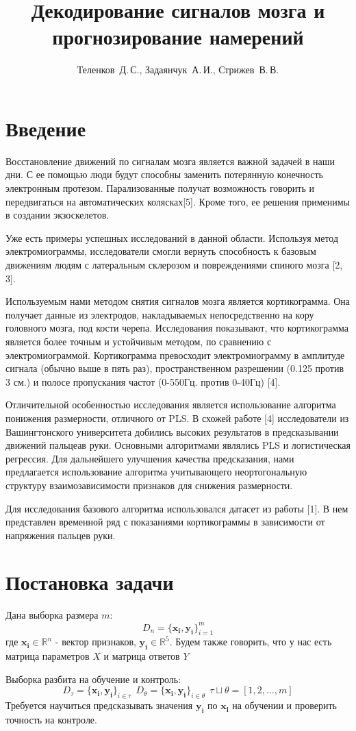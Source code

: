 \documentclass[12pt,twoside]{article}
\title
    [Декодирование сигналов мозга и прогнозирование намерений] %
    {Декодирование сигналов мозга и прогнозирование намерений} %
\author
    [Теленков~Д.\,С.] %
    {Теленков~Д.\,С., Задаянчук~А.\,И., Стрижев~В.\,В.} %
\begin{document}
\maketitle
\section{Введение}
Восстановление движений по сигналам мозга является важной задачей в наши дни. С ее помощью люди будут способны заменить потерянную конечность электронным протезом. Парализованные получат возможность говорить и передвигаться на автоматических колясках[5]. Кроме того, ее решения применимы в создании экзоскелетов.\par
Уже есть примеры успешных исследований в данной области. Используя метод электромиограммы, исследователи смогли вернуть способность к базовым движениям людям с латеральным склерозом и повреждениями спиного мозга [2, 3].  \par
Используемым нами методом снятия сигналов мозга является кортикограмма. Она получает данные из электродов, накладываемых непосредственно на кору головного мозга, под кости черепа. Исследования показывают, что кортикограмма является более точным и устойчивым методом, по сравнению с электромиограммой. Кортикограмма превосходит электромиограмму в амплитуде сигнала (обычно выше в пять раз), пространственном разрешении (0.125 против 3 см.) и полосе пропускания частот (0-550Гц. против 0-40Гц) [4].\par
Отличительной особенностью исследования является использование алгоритма понижения размерности, отличного от PLS. В схожей работе [4] исследователи из Вашингтонского университета добились высоких результатов в предсказывании движений пальцеав руки. Основными алгоритмами являлись PLS и логистическая регрессия. Для дальнейшего улучшения качества предсказания, нами предлагается использование алгоритма учитывающего неортогональную структуру взаимозависимости признаков для снижения размерности.\par
Для исследования базового алгоритма использовался датасет из работы [1]. В нем представлен временной ряд с показаниями кортикограммы в зависимости от напряжения пальцев руки.

\section{Постановка задачи}
Дана выборка размера $m$:
$$D_n = \{\pmb{x_i}, \pmb{y_i}\}^m_{i=1}$$
где $\pmb{x_i} \in \mathbb{R}^n$ - вектор признаков, $\pmb{y_i} \in \mathbb{R}^5$. Будем также говорить, что у нас есть матрица параметров $X$ и матрица ответов $Y$ \par
Выборка разбита на обучение и контроль:
$$D_\tau = \{\pmb{x_i}, \pmb{y_i}\}_{i\in\tau}\ \ D_\theta = \{\pmb{x_i}, \pmb{y_i}\}_{i\in\theta}\ \ \tau \sqcup \theta = [1, 2, \ldots, m]$$
Требуется научиться предсказывать значения $\pmb{y_i}$ по $\pmb{x_i}$ на обучении и проверить точность на контроле.
\end{document}
